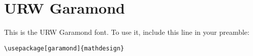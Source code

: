 \documentclass{article}
\begin{document}
\section*{URW Garamond}
This is the URW Garamond font.
To use it, include this line in your preamble:
\begin{verbatim}
\usepackage[garamond]{mathdesign}
\end{verbatim}


\end{document}
